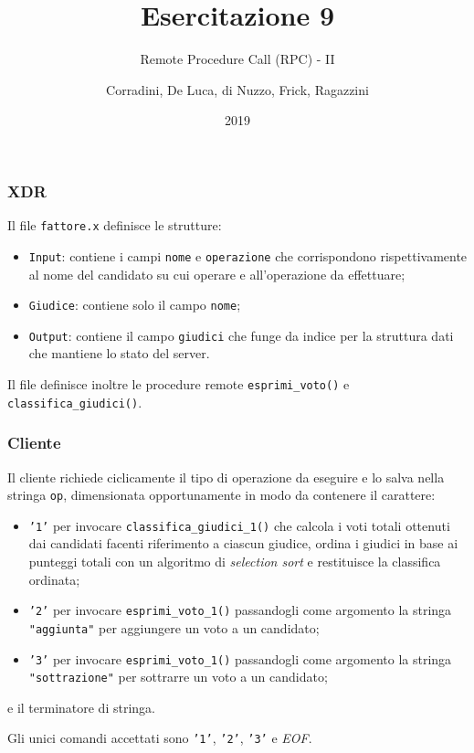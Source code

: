 \documentclass{beamer}
\begin{document}
\title{Esercitazione 9}
\subtitle{Remote Procedure Call (RPC) - II}
\author{Corradini, De Luca, di Nuzzo, Frick, Ragazzini}
\date{2019}
\begin{frame}
\titlepage
\end{frame}
\begin{frame}
    \frametitle{XDR}

    Il file \texttt{fattore.x} definisce le strutture:
    \begin{itemize}
        \item \texttt{Input}: contiene i campi \texttt{nome} e \texttt{operazione} che corrispondono rispettivamente al nome del candidato su cui operare e all'operazione da effettuare;
        \item \texttt{Giudice}: contiene solo il campo \texttt{nome};
        \item \texttt{Output}: contiene il campo \texttt{giudici} che funge da indice per la struttura dati che mantiene lo stato del server.
    \end{itemize}
    Il file definisce inoltre le procedure remote \texttt{esprimi\_voto()} e \texttt{classifica\_giudici()}.

\end{frame}
\begin{frame}
    \frametitle{Cliente}

    Il cliente richiede ciclicamente il tipo di operazione da eseguire e lo salva nella stringa \texttt{op}, dimensionata opportunamente in modo da contenere il carattere:\begin{itemize}
        \item \texttt{'1'} per invocare \texttt{classifica\_giudici\_1()} che calcola i voti totali ottenuti dai candidati facenti riferimento a ciascun giudice, ordina i giudici in base ai punteggi totali con un algoritmo di \textit{selection sort} e restituisce la classifica ordinata;
        \item \texttt{'2'} per invocare \texttt{esprimi\_voto\_1()} passandogli come argomento la stringa \texttt{"aggiunta"} per aggiungere un voto a un candidato;
        \item \texttt{'3'} per invocare \texttt{esprimi\_voto\_1()} passandogli come argomento la stringa \texttt{"sottrazione"} per sottrarre un voto a un candidato;
    \end{itemize}
    e il terminatore di stringa.

    Gli unici comandi accettati sono \texttt{'1'}, \texttt{'2'}, \texttt{'3'} e \textit{EOF}.

\end{frame}
\end{document}
